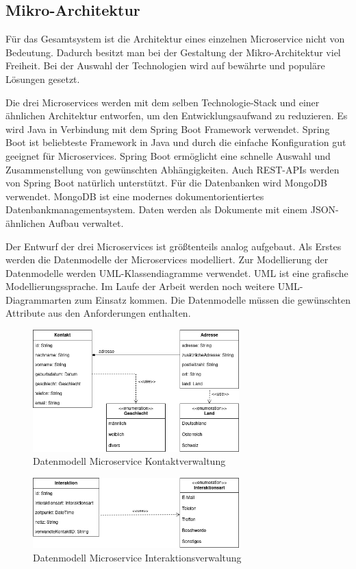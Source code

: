 \subsection{Mikro-Architektur}

Für das Gesamtsystem ist die Architektur eines einzelnen Microservice nicht von Bedeutung. Dadurch besitzt man bei der Gestaltung der Mikro-Architektur viel Freiheit. Bei der Auswahl der Technologien wird auf bewährte und populäre Lösungen gesetzt.

Die drei Microservices werden mit dem selben Technologie-Stack und einer ähnlichen Architektur entworfen, um den Entwicklungsaufwand zu reduzieren. Es wird Java in Verbindung mit dem Spring Boot Framework verwendet. Spring Boot ist beliebteste Framework in Java und durch die einfache Konfiguration gut geeignet für Microservices. Spring Boot ermöglicht eine schnelle Auswahl und Zusammenstellung von gewünschten Abhängigkeiten. Auch REST-APIs werden von Spring Boot natürlich unterstützt. Für die Datenbanken wird MongoDB verwendet. MongoDB ist eine modernes dokumentorientiertes Datenbankmanagementsystem. Daten werden als Dokumente mit einem \ac{JSON}-ähnlichen Aufbau verwaltet. 

Der Entwurf der drei Microservices ist größtenteils analog aufgebaut. Als Erstes werden die Datenmodelle der Microservices modelliert. Zur Modellierung der Datenmodelle werden UML-Klassendiagramme verwendet. UML ist eine grafische Modellierungssprache. Im Laufe der Arbeit werden noch weitere UML-Diagrammarten zum Einsatz kommen. Die Datenmodelle müssen die gewünschten Attribute aus den Anforderungen enthalten.

\begin{figure}[H] 
    \centering
    \includegraphics[width=0.71\textwidth]{figures/DatenmodellKontakt.png}
    \caption{Datenmodell Microservice Kontaktverwaltung}
    \label{fig:CRMENTWURF}
\end{figure} 

\begin{figure}[H] 
    \centering
    \includegraphics[width=0.71\textwidth]{figures/DatenmodellInteraktion.png}
    \caption{Datenmodell Microservice Interaktionsverwaltung}
    \label{fig:CRMENTWURF}
\end{figure} 

